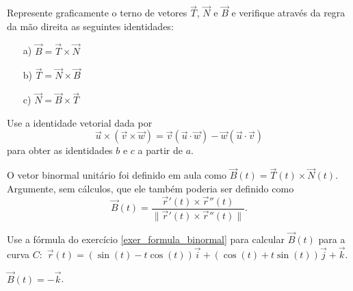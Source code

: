 \begin{exer} Represente graficamente o terno de vetores $\vec{T}$, $\vec{N}$ e $\vec{B}$ e verifique através da regra da mão direita as seguintes identidades:
\begin{itemize}
\item[a)]$\vec{B}=\vec{T}\times\vec{N}$
\item[b)]$\vec{T}=\vec{N}\times\vec{B}$
\item[c)]$\vec{N}=\vec{B}\times\vec{T}$
\end{itemize}
Use a identidade vetorial dada por
$$\vec{u}\times\left(\vec{v}\times\vec{w}\right)=\vec{v}\left(\vec{u}\cdot\vec{w}\right)-\vec{w}\left(\vec{u}\cdot\vec{v}\right)$$ para obter as identidades $b$ e $c$ a partir de $a$.
\end{exer}
\begin{exer}\label{exer_formula_binormal}
 O vetor binormal unitário foi definido em aula como $\vec{B}(t)=\vec{T}(t)\times\vec{N}(t)$. Argumente, sem cálculos, que ele também poderia ser definido como
 $$
 \vec{B}(t)=\frac{\vec{r}'(t)\times \vec{r}''(t)}{\|\vec{r}'(t)\times \vec{r}''(t)\|}.
 $$
\end{exer}
\begin{exer}
 Use a fórmula do exercício \ref{exer_formula_binormal} para calcular $\vec{B}(t)$ para a curva $C:$ $\vec{r}(t)=(\sin(t)-t\cos(t))\vec{i}+(\cos(t)+t\sin(t))\vec{j}+\vec{k}$.
\end{exer}
\begin{resp}
 $\vec{B}(t)=-\vec{k}$.
\end{resp}


